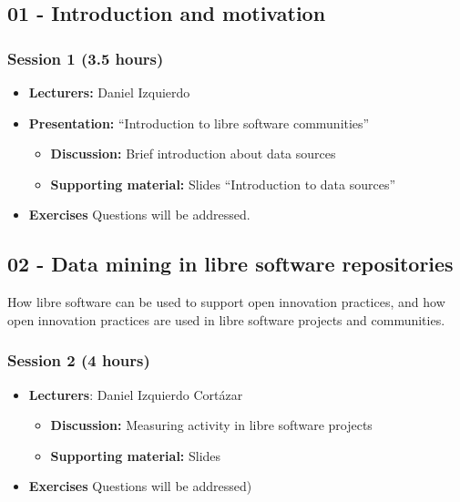 \documentclass[a4paper]{article}
\begin{document}
\subsection{01 - Introduction and motivation}



\subsubsection{Session 1 (3.5 hours)}

\begin{itemize}
\item \textbf{Lecturers:} Daniel Izquierdo
\item \textbf{Presentation:} ``Introduction to libre software communities''
  \begin{itemize}
  \item \textbf{Discussion:} Brief introduction about data sources
  \item \textbf{Supporting material:} Slides ``Introduction to data sources''
  \end{itemize}
\item \textbf{Exercises} Questions will be addressed.

\end{itemize}



\subsection{02 - Data mining in libre software repositories}

How libre software can be used to support open innovation practices, and how open innovation practices are used in libre software projects and communities.

\subsubsection{Session 2 (4 hours)}

\begin{itemize}
\item \textbf{Lecturers}: Daniel Izquierdo Cortázar
  \begin{itemize}
  \item \textbf{Discussion:} Measuring activity in libre software projects
  \item \textbf{Supporting material:} Slides
  \end{itemize}
\item \textbf{Exercises} Questions will be addressed)

\end{itemize}
\end{document}
